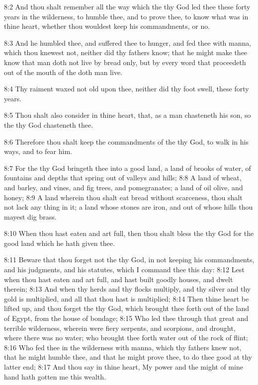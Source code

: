 8:2 And thou shalt remember all the way which the \LORD thy God led thee these forty years in the wilderness, to humble thee, and to prove thee, to know what was in thine heart, whether thou wouldest keep his commandments, or no.

8:3 And he humbled thee, and suffered thee to hunger, and fed thee with manna, which thou knewest not, neither did thy fathers know; that he might make thee know that man doth not live by bread only, but by every word that proceedeth out of the mouth of the \LORD doth man live.

8:4 Thy raiment waxed not old upon thee, neither did thy foot swell, these forty years.

8:5 Thou shalt also consider in thine heart, that, as a man chasteneth his son, so the \LORD thy God chasteneth thee.

8:6 Therefore thou shalt keep the commandments of the \LORD thy God, to walk in his ways, and to fear him.

8:7 For the \LORD thy God bringeth thee into a good land, a land of brooks of water, of fountains and depths that spring out of valleys and hills; 8:8 A land of wheat, and barley, and vines, and fig trees, and pomegranates; a land of oil olive, and honey; 8:9 A land wherein thou shalt eat bread without scarceness, thou shalt not lack any thing in it; a land whose stones are iron, and out of whose hills thou mayest dig brass.

8:10 When thou hast eaten and art full, then thou shalt bless the \LORD thy God for the good land which he hath given thee.

8:11 Beware that thou forget not the \LORD thy God, in not keeping his commandments, and his judgments, and his statutes, which I command thee this day: 8:12 Lest when thou hast eaten and art full, and hast built goodly houses, and dwelt therein; 8:13 And when thy herds and thy flocks multiply, and thy silver and thy gold is multiplied, and all that thou hast is multiplied; 8:14 Then thine heart be lifted up, and thou forget the \LORD thy God, which brought thee forth out of the land of Egypt, from the house of bondage; 8:15 Who led thee through that great and terrible wilderness, wherein were fiery serpents, and scorpions, and drought, where there was no water; who brought thee forth water out of the rock of flint; 8:16 Who fed thee in the wilderness with manna, which thy fathers knew not, that he might humble thee, and that he might prove thee, to do thee good at thy latter end; 8:17 And thou say in thine heart, My power and the might of mine hand hath gotten me this wealth.


